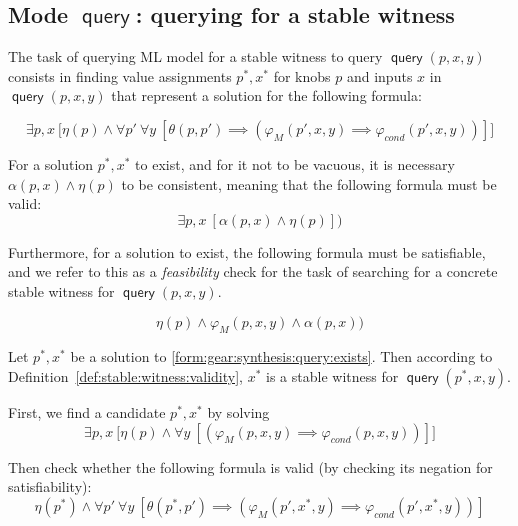 \documentclass[a4paper,parskip=half]{article} %
\newcommand*\query{\operatorname{\mathsf{query}}}
\newcommand*\mode[1]{\operatorname{\mathsf{#1}}} %
\begin{document}
\subsection{Mode $\mode{query}$: querying for a stable witness}


The task of querying ML model for a stable witness to query $\query(p, x, y)$ consists in finding value assignments  
$p^*,x^*$  for knobs $p$ and inputs $x$ in $\query(p, x, y)$ that represent a solution for the following formula:

\begin{equation}\label{form:gear:synthesis:query:exists}
    \exists p, x ~\big[ \eta(p) \wedge
    \forall p'~
    \forall y~[
    \theta(p,p') \implies (\varphi_M(p',x,y)  \implies  \varphi_{\mathit{cond}}(p',x,y))
    ]\big]
\end{equation} 

For a solution $p^*,x^*$ to exist, and for it not to be vacuous, it is necessary $\alpha(p, x) \wedge \eta(p)$ to be consistent, 
meaning that the following formula must be valid:
\begin{equation}\label{form:gear:query:consistency}
\exists p,x~ [\alpha(p, x) \wedge \eta(p)])
\end{equation}

Furthermore, for a solution to exist, the following formula must be satisfiable, and we refer to this as a \emph{feasibility} 
check for the task of searching for a concrete stable witness for $\query(p,x,y)$. 

\begin{equation}\label{form:gear:query:feasibility}
       \eta(p) \wedge \varphi_M(p,x,y)  \wedge  \alpha(p,x))
\end{equation}

Let $p^*, x^*$ be a solution to \cref{form:gear:synthesis:query:exists}. Then according to Definition~\ref{def:stable:witness:validity}, 
$x^*$ is a stable witness for  $\query(p^*, x, y)$. 



First, we find a candidate $p^*, x^*$ by solving
\begin{equation}\label{form:gear:synthesis:query}
    \exists p, x ~\big[ \eta(p) \wedge
    \forall y~[
    (\varphi_M(p,x,y)  \implies  \varphi_{\mathit{cond}}(p,x,y))
    ]\big]
\end{equation} 

Then check whether the following formula is valid (by checking its negation for satisfiability): 
\begin{equation}\label{form:gear:synthesis:query}
    \eta(p^*) \wedge
    \forall p'~
    \forall y~[
    \theta(p^*,p') \implies (\varphi_M(p',x^*,y)  \implies  \varphi_{\mathit{cond}}(p',x^*,y))
    ]
\end{equation} 
\end{document}
